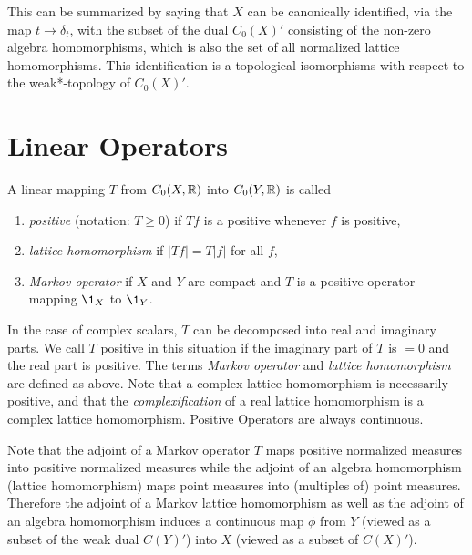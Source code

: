 This can be summarized by saying that $X$ can be canonically identified, via the map $t \to \delta_{t}$, with the subset of the dual $C_{0}(X)'$ consisting of the non-zero algebra homomorphisms, which is also the set of all normalized lattice homomorphisms.
This identification is a topological isomorphisms with respect to the weak*-topology of $ C_{0}(X)' $.
\section{Linear Operators}\label{sec:b1-1.3}
A linear mapping $T$ from $C_{0}(X,\mathbb{R})$ into $C_{0}(Y,\mathbb{R})$ is called
\begin{enumerate}[\upshape (i), labelindent=.5em]

\item
\emph{positive} (notation: $T \geq 0$)  if $Tf$  is a positive whenever $ f $ is positive, 

\item
\emph{lattice homomorphism}  if $|Tf| = T|f|$  for all $ f $,

\item
\emph{Markov-operator}  if  $ X $ and $ Y $ are compact and $ T $ is a positive operator mapping $\1_{X}$ to $\1_{Y}$.

\end{enumerate}
In the case of complex scalars, $T$ can be decomposed into real and imaginary parts.
We call $T$ positive in this situation if the imaginary part of $T$ is $= 0$ and the real part is positive.
The terms \emph{Markov operator} and \emph{lattice homomorphism} are defined as above.
Note that a complex lattice homomorphism is necessarily positive, and that the \emph{complexification} of a real lattice homomorphism is a complex lattice homomorphism.
Positive Operators are always continuous.

Note that the adjoint of a Markov operator $T$ maps positive normalized measures into positive normalized measures while the adjoint of an algebra homomorphism (lattice homomorphism) maps point measures into (multiples of) point measures.
Therefore the adjoint of a Markov lattice homomorphism as well as the adjoint of an algebra homomorphism induces a continuous map $\phi$ from $Y$ (viewed as a subset of the weak dual $C(Y)'$) into $X$ (viewed as a subset of $C(X)'$).

